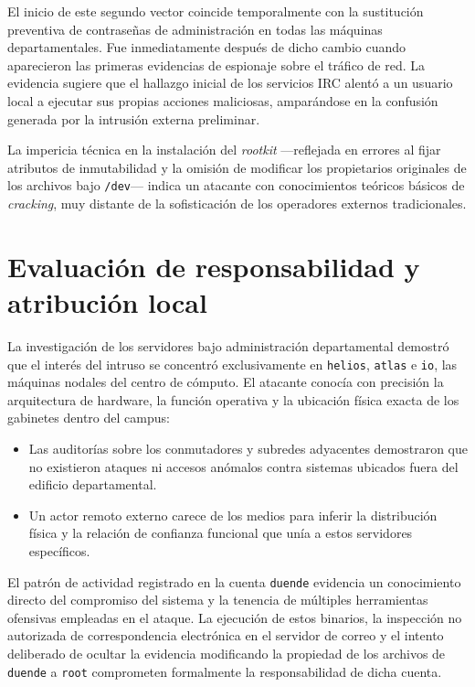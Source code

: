 El inicio de este segundo vector coincide temporalmente con la sustitución preventiva de contraseñas de administración en todas las máquinas departamentales. Fue inmediatamente después de dicho cambio cuando aparecieron las primeras evidencias de espionaje sobre el tráfico de red. La evidencia sugiere que el hallazgo inicial de los servicios IRC alentó a un usuario local a ejecutar sus propias acciones maliciosas, amparándose en la confusión generada por la intrusión externa preliminar.

La impericia técnica en la instalación del \textit{rootkit} ---reflejada en errores al fijar atributos de inmutabilidad y la omisión de modificar los propietarios originales de los archivos bajo \texttt{/dev}--- indica un atacante con conocimientos teóricos básicos de \textit{cracking}, muy distante de la sofisticación de los operadores externos tradicionales.

\section{Evaluación de responsabilidad y atribución local}

La investigación de los servidores bajo administración departamental demostró que el interés del intruso se concentró exclusivamente en \texttt{helios}, \texttt{atlas} e \texttt{io}, las máquinas nodales del centro de cómputo. El atacante conocía con precisión la arquitectura de hardware, la función operativa y la ubicación física exacta de los gabinetes dentro del campus:
\begin{itemize}
    \item Las auditorías sobre los conmutadores y subredes adyacentes demostraron que no existieron ataques ni accesos anómalos contra sistemas ubicados fuera del edificio departamental.
    \item Un actor remoto externo carece de los medios para inferir la distribución física y la relación de confianza funcional que unía a estos servidores específicos.
\end{itemize}

El patrón de actividad registrado en la cuenta \texttt{duende} evidencia un conocimiento directo del compromiso del sistema y la tenencia de múltiples herramientas ofensivas empleadas en el ataque. La ejecución de estos binarios, la inspección no autorizada de correspondencia electrónica en el servidor de correo y el intento deliberado de ocultar la evidencia modificando la propiedad de los archivos de \texttt{duende} a \texttt{root} comprometen formalmente la responsabilidad de dicha cuenta.

